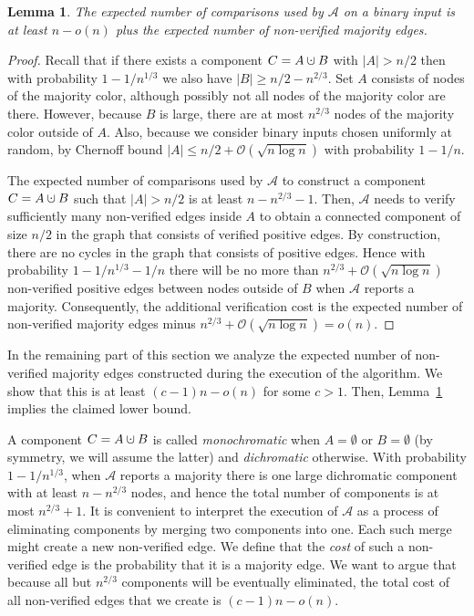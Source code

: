 \documentclass{article}[11pt,a4paper]
\newtheorem{lemma}[definition]{Lemma}
\newcommand{\bigo}{\mathcal{O}}
\newcommand{\cupdot}{\mathbin{\mathaccent\cdot\cup}}
\begin{document}
\begin{lemma}
\label{lem:verify}
The expected number of comparisons used by $\mathcal{A}$ on a binary input is at least
$n-o(n)$ plus the expected number of non-verified majority edges.
\end{lemma}

\begin{proof}
Recall that if there exists a component $C=A\cupdot B$ with $|A|>n/2$
then with probability $1-1/n^{1/3}$ we also have $|B| \geq n/2-n^{2/3}$.
Set $A$ consists of nodes of the majority color, although possibly not all nodes of the majority color are there. 
However, because $B$ is large, there are at most $n^{2/3}$ nodes of the majority color
outside of $A$. Also, because we consider binary inputs chosen uniformly at random,
by Chernoff bound $|A| \leq n/2+\bigo(\sqrt{n\log n})$ with probability $1-1/n$.

The expected number of comparisons used by $\mathcal{A}$ to construct
a component $C=A\cupdot B$ such that $|A|> n/2$ is at least $n-n^{2/3}-1$.
Then, $\mathcal{A}$ needs to verify sufficiently many non-verified edges inside $A$ to obtain
a connected component of size $n/2$ in the graph that consists of verified positive
edges. By construction, there are no cycles in the graph that consists of positive edges.
Hence with probability $1-1/{n^{1/3}}-1/n$ there will be no more than
$n^{2/3}+\bigo(\sqrt{n\log n})$ non-verified positive edges between nodes outside of $B$
when $\mathcal{A}$ reports a majority. Consequently, the additional verification cost
is the expected number of non-verified majority edges minus
$n^{2/3}+\bigo(\sqrt{n\log n})=o(n)$.
\end{proof}

In the remaining part of this section we analyze the expected number of non-verified
majority edges constructed during the execution of the algorithm.
We show that this is at least $(c-1)n-o(n)$ for some $c > 1$. Then, Lemma~\ref{lem:verify} implies
the claimed lower bound.

A component $C=A\cupdot B$ is called \emph{monochromatic} when $A=\emptyset$ or
$B=\emptyset$ (by symmetry, we will assume the latter) and \emph{dichromatic} otherwise.
With probability $1-1/n^{1/3}$, when $\mathcal{A}$ reports a majority there is
one large dichromatic component with at least $n-n^{2/3}$ nodes, and hence the total number of
components is at most $n^{2/3}+1$. It is convenient to interpret the execution of $\mathcal{A}$
as a process of eliminating components by merging two components into one.
Each such merge might create a new non-verified edge. We define that the \emph{cost} of such a non-verified edge is the probability that it is a majority edge.
We want to argue that because all but $n^{2/3}$ components will be eventually eliminated,
the total cost of all non-verified edges that we create is $(c-1)n-o(n)$.
\end{document}
